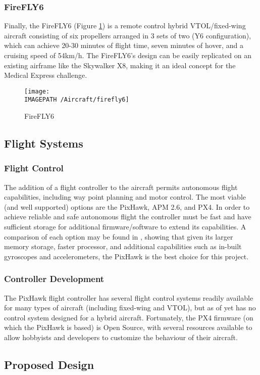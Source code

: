 \subsubsection*{FireFLY6}
Finally, the FireFLY6\cite{ref:firefly6} (Figure \ref{fig:firefly6}) is a remote control hybrid VTOL/fixed-wing aircraft consisting of six propellers arranged in 3 sets of two (Y6 configuration), which can achieve 20-30 minutes of flight time, seven minutes of hover, and a cruising speed of 54km/h. The FireFLY6's design can be easily replicated on an existing airframe like the Skywalker X8, making it an ideal concept for the Medical Express challenge.\\

\begin{figure}[!h]
	\centering
	\texttt{[image: \\IMAGEPATH /Aircraft/firefly6]}
	\caption{FireFLY6}
	\label{fig:firefly6}
\end{figure}

\subsection{Flight Systems}
\subsubsection*{Flight Control}
The addition of a flight controller to the aircraft permits autonomous flight capabilities, including way point planning and motor control. The most viable (and well supported) options are the PixHawk\cite{ref:pixhawk}, APM 2.6\cite{ref:ardupilot}, and PX4\cite{ref:px4}. In order to achieve reliable and safe autonomous flight the controller must be fast and have sufficient storage for additional firmware/software to extend its capabilities. A comparison of each option may be found in \cite{ref:controller_comparison}, showing that given its larger memory storage, faster processor, and additional capabilities such as in-built gyroscopes and accelerometers, the PixHawk is the best choice for this project.

\subsubsection*{Controller Development}
The PixHawk flight controller has several flight control systems readily available for many types of aircraft (including fixed-wing and VTOL), but as of yet has no control system designed for a hybrid aircraft. Fortunately, the PX4 firmware (on which the PixHawk is based) is Open Source\cite{ref:ardupilotgit}, with several resources available\cite{ref:firmware1,ref:firmware2} to allow hobbyists and developers to customize the behaviour of their aircraft.


\subsection{Proposed Design}
